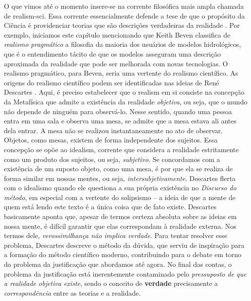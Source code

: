 \documentclass[./main.tex]{subfiles}
\begin{document}
\par O que vimos até o momento insere-se na corrente filosófica mais ampla chamada de \gls{realism-sci}. Essa corrente essencialmente defende a tese de que o propósito da Ciência é providenciar teorias que são descrições verdadeiras da realidade \cite{bas1980}. Por exemplo, iniciamos este capítulo mencionando que Keith Beven classifica de \textit{realismo pragmático} a filosofia da maioria dos usuários de modelos hidrológicos, que é o entendimento tácito de que os modelos asseguram uma descrição aproximada da realidade que pode ser melhorada com novas tecnologias. O realismo pragmático, para Beven, seria uma vertente do realismo científico. As origens do realismo científico podem ser identificadas nas ideias de René Descartes \cite{Agazzi2017}. Aqui, é preciso estabelecer que o \gls{realism} em si consiste na concepção da Metafísica que admite a existência da realidade \textit{objetiva}, ou seja, que o mundo não depende de ninguém para observá-lo. Nesse sentido, quando uma pessoa entra em uma sala e observa uma mesa, se admite que a mesa estava ali antes dela entrar. A mesa não se realizou instantaneamente no ato de observar. Objetos, como mesas, existem de forma independente dos sujeitos. Essa concepção se opõe ao \gls{idealism}, corrente que considera a realidade estritamente como um produto dos sujeitos, ou seja, \textit{subjetivo}. Se concordamos com a existência de um suposto objeto, como uma mesa, é por que ela se realiza de forma similar em nossas mentes, ou seja, \textit{intersubjetivamente}. Descartes flerta com o idealismo quando ele questiona a sua própria existência no \textit{Discurso do método}, em especial com a vertente do solipsismo -- a ideia de que a mente de quem está lendo este texto é a única coisa que de fato existe. Descartes basicamente aponta que, apesar de termos certeza absoluta sobre as ideias em nossa mente, é difícil garantir que elas correspondam à realidade externa. Nos termos dele, \textit{verossimilhança não implica verdade}. Para tentar resolver esse problema, Descartes descreve o método da dúvida, que serviu de inspiração para a formação do método científico moderno, contribuindo para o debate em torno do problema da justificação que abordamos até agora. No final das contas, o problema da justificação está inerentemente contaminado pelo \textit{pressuposto de que a realidade objetiva existe}, sendo o conceito de \textbf{verdade} precisamente a \textit{correspondência} entre as teorias e a realidade.
\end{document}
